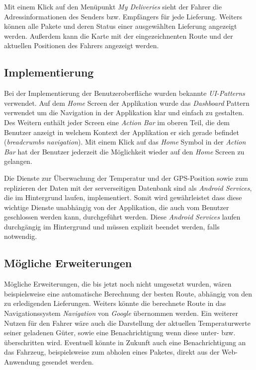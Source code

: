 Mit einem Klick auf den Menüpunkt \emph{My Deliveries} sieht der Fahrer die Adressinformationen des Senders bzw. Empfängers für jede Lieferung.
Weiters können alle Pakete und deren Status einer ausgewählten Lieferung angezeigt werden. 
Außerdem kann die Karte mit der eingezeichnenten Route und der aktuellen Positionen des Fahrers angezeigt werden.

\subsection{Implementierung}

Bei der Implementierung der Benutzeroberfläche wurden bekannte \emph{UI-Patterns} verwendet. Auf dem \emph{Home} Screen der Applikation
wurde das \emph{Dashboard} Pattern verwendet um die Navigation in der Applikation klar und einfach zu gestalten. Des Weitern enthält jeder
Screen eine \emph{Action Bar} im oberen Teil, die dem Benutzer anzeigt in welchem Kontext der Applikation er sich gerade befindet (\emph{breadcrumbs navigation}).
Mit einem Klick auf das \emph{Home} Symbol in der \emph{Action Bar} hat der Benutzer jederzeit die Möglichkeit wieder auf den \emph{Home} Screen zu gelangen.

Die Dienste zur Überwachung der Temperatur und der GPS-Position sowie zum replizieren der Daten mit der serverseitigen Datenbank sind als \emph{Android Services},
die im Hintergrund laufen, implementiert. Somit wird gewährleistet dass diese wichtige Dienste unabhängig von der Applikation, die auch vom Benutzer geschlossen werden kann,
durchgeführt werden. Diese \emph{Android Services} laufen durchgängig im Hintergrund und müssen explizit beendet werden, falls notwendig.

\subsection{Mögliche Erweiterungen}

Mögliche Erweiterungen, die bis jetzt noch nicht umgesetzt wurden, wären beispielsweise eine automatische Berechnung der besten Route, abhängig
von den zu erledigenden Lieferungen. Weiters könnte die berechnete Route in das Navigationssystem \emph{Navigation} von \emph{Google} übernommen werden.
Ein weiterer Nutzen für den Fahrer wäre auch die Darstellung der aktuellen Temperaturwerte seiner geladenen Güter, sowie eine Benachrichtigung wenn diese unter-
bzw. überschritten wird. Eventuell könnte in Zukunft auch eine Benachrichtigung an das Fahrzeug, beispielsweise zum abholen eines Paketes, direkt
aus der Web-Anwendung gesendet werden.

